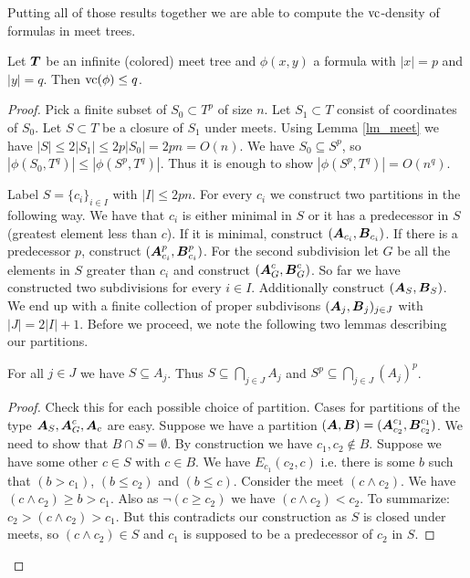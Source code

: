 \documentclass{amsart}
\DeclareMathOperator{\TT}{\boldface T}
\DeclareMathOperator{\A}{\boldface A}
\DeclareMathOperator{\B}{\boldface B}
\begin{document}
Putting all of those results together we are able to compute the $\operatorname{vc}$-density of formulas in meet trees.

\begin{Theorem}
	Let $\TT$ be an infinite (colored) meet tree and $\phi(x, y)$ a formula with $|x| = p$ and $|y| = q$. Then $\operatorname{vc}(\phi) \leq q$.
\end{Theorem}

\begin{proof}
	Pick a finite subset of $S_0 \subset T^p$ of size $n$. Let $S_1 \subset T$ consist of coordinates of $S_0$. Let $S \subset T$ be a closure of $S_1$ under meets. Using Lemma \ref{lm_meet} we have $|S| \leq 2|S_1| \leq 2p|S_0| = 2pn = O(n)$. We have $S_0 \subseteq S^p$, so $|\phi(S_0, T^q)| \leq |\phi(S^p, T^q)|$. Thus it is enough to show $|\phi(S^p, T^q)| = O(n^q)$.
	
	Label $S = \{c_i\}_{i \in I}$ with $|I| \leq 2pn$. For every $c_i$ we construct two partitions in the following way. We have that $c_i$ is either minimal in $S$ or it has a predecessor in $S$ (greatest element less than $c$). If it is minimal, construct $(\A_{c_i}, \B_{c_i})$. If there is a predecessor $p$, construct $(\A^p_{c_i}, \B^p_{c_i})$. For the second subdivision let $G$ be all the elements in $S$ greater than $c_i$ and construct $(\A^c_G, \B^c_G)$. So far we have constructed two subdivisions for every $i \in I$. Additionally construct $(\A_S, \B_S)$. We end up with a finite collection of proper subdivisons $(\A_j, \B_j)_{j \in J}$ with $|J| = 2|I| + 1$. Before we proceed, we note the following two lemmas describing our partitions.
	
	\begin{Lemma}
		For all $j \in J$ we have $S \subseteq A_j$. Thus $S \subseteq \bigcap_{j \in J} A_j$ and $S^p \subseteq \bigcap_{j \in J} (A_j)^p$. 
	\end{Lemma}
	
	\begin{proof}
		Check this for each possible choice of partition. Cases for partitions of the type $\A_S, \A^c_G, \A_c$ are easy. Suppose we have a partition $(\A, \B) = (\A^{c_1}_{c_2}, \B^{c_1}_{c_2})$. We need to show that $B \cap S = \emptyset$. By construction we have $c_1, c_2 \notin B$. Suppose we have some other $c \in S$ with $c \in B$. We have $E_{c_1}(c_2, c)$ i.e. there is some $b$ such that $(b > c_1)$, $(b \leq c_2)$ and $(b \leq c)$. Consider the meet $(c \wedge c_2)$. We have $(c \wedge c_2) \geq b > c_1$. Also as $\neg (c \geq c_2)$ we have $(c \wedge c_2) < c_2$. To summarize: $c_2 > (c \wedge c_2) > c_1$. But this contradicts our construction as $S$ is closed under meets, so $(c \wedge c_2) \in S$ and $c_1$ is supposed to be a predecessor of $c_2$ in $S$.
	\end{proof}
	

\end{proof}
\end{document}
